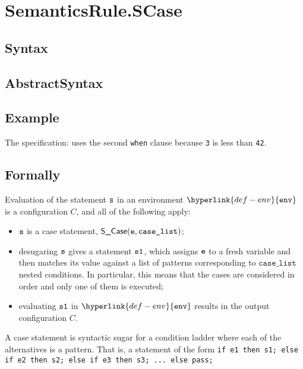 \documentclass{book}
\newcommand\caselist[0]{\texttt{case\_list}}
\newcommand\env[0]{\hyperlink{def-env}{\texttt{env}}}
\begin{document}


\section{SemanticsRule.SCase \label{sec:SemanticsRule.SCase}}

\subsection{Syntax}

\subsection{AbstractSyntax}

\subsection{Example}
    The specification:
    uses the second \texttt{when} clause because \texttt{3} is less than \texttt{42}.

\subsection{Formally}
    Evaluation of the statement $\texttt{s}$ in an environment $\env$ is a configuration $C$,
    and all of the following apply:
    \begin{itemize}
    \item $\texttt{s}$ is a case statement, $\SCase(\ve, \caselist)$;
    \item desugaring $\texttt{s}$ gives a statement $\texttt{s1}$, which assigns $\texttt{e}$ to a fresh variable
    and then matches its value against a list of patterns corresponding to $\caselist$ nested conditions.
    In particular, this means that the cases are considered in order and only one of them is executed;
    \item evaluating $\texttt{s1}$ in $\env$ results in the output configuration $C$.
    \end{itemize}

  \hypertarget{def-casetoconds}{}
A case statement is syntactic sugar for a condition ladder where each
of the alternatives is a pattern.
That is, a statement of the form
\texttt{if e1 then s1; else if e2 then s2; else if e3 then s3; ... else pass;}
\end{document}
